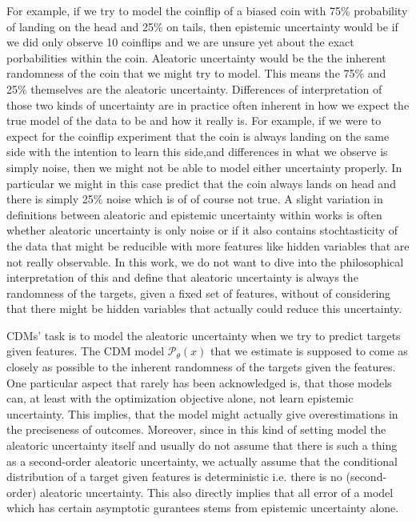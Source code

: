 For example, if we try to model the coinflip of a biased coin with 75\% probability of landing on the head and 25\% on tails, then epistemic uncertainty would be if we did only observe 10 coinflips and we are unsure yet about the exact porbabilities within the coin. Aleatoric uncertainty would be the the inherent randomness of the coin that we might try to model. This means the 75\% and 25\% themselves are the aleatoric uncertainty.
Differences of interpretation of those two kinds of uncertainty are in practice often inherent in how we expect the true model of the data to be and how it really is. For example, if we were to expect for the coinflip experiment that the coin is always landing on the same side with the intention to learn this side,and differences in what we observe is simply noise, then we might not be able to model either uncertainty properly. In particular we might in this case predict that the coin always lands on head and there is simply 25\% noise which is of of course not true.
A slight variation in definitions between aleatoric and epistemic uncertainty within works \cite{hullermeier_aleatoric_2021} is often whether aleatoric uncertainty is only noise or if it also contains stochtasticity of the data that might be reducible with more features like hidden variables that are not really observable. In this work, we do not want to dive into the philosophical interpretation of this and define that aleatoric uncertainty is always the randomness of the targets, given a fixed set of features, without of considering that there might be hidden variables that actually could reduce this uncertainty.

CDMs' task is to model the aleatoric uncertainty when we try to predict targets given features. The CDM model $\mathscr{P}_\theta(x)$ that we estimate is supposed to come as closely as possible to the inherent randomness of the targets given the features. One particular aspect that rarely has been acknowledged is, that those models can, at least with the optimization objective alone, not learn epistemic uncertainty. This implies, that the model might actually give overestimations in the preciseness of outcomes. Moreover, since in this kind of setting model the aleatoric uncertainty itself and usually do not assume that there is such a thing as a second-order aleatoric uncertainty, we actually assume that the conditional distribution of a target given features is deterministic i.e. there is no (second-order) aleatoric uncertainty. This also directly implies that all error of a model which has certain asymptotic gurantees stems from epistemic uncertainty alone.

